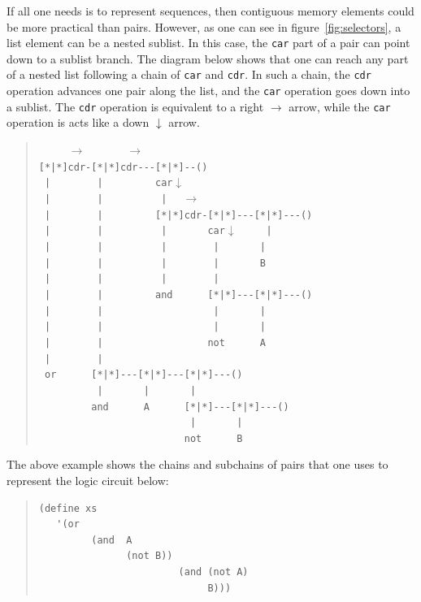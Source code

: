 \documentclass[a4paper,12pt]{book}
\newenvironment{fmpage}[1]
               {\begin{lrbox}{\fmbox}\begin{minipage}{#1}}
               {\end{minipage}\end{lrbox}\fbox{\usebox{\fmbox}}}
\begin{document}
\begin{fmpage}{0.8\linewidth}
\verb||
\end{fmpage}


If all one needs is to represent
sequences, then contiguous memory
elements could be more
practical than pairs. However, as one
can see in figure~\ref{fig:selectors},
a list element can be a nested sublist.
In this case, 
the \verb|car| part of a pair can point down to
a sublist branch. The diagram below shows
that one can reach any part of a nested
list following a chain of \verb|car| and \verb|cdr|.
In such a chain, the \verb|cdr| operation
 advances one pair along the list, and
 the \verb|car| operation goes down into a sublist.
 The \verb|cdr| operation is equivalent to a
 right $\rightarrow$  arrow, while the \verb|car|
 operation is acts like a down $\downarrow$ arrow.
\begin{quote}
\verb"     "$\rightarrow$\verb"       "$\rightarrow$\\
\verb"[*|*]cdr-[*|*]cdr---[*|*]--()"\\
\verb" |        |         car"$\downarrow$\\
\verb" |        |          |  " $\rightarrow$\\
\verb" |        |         [*|*]cdr-[*|*]---[*|*]---()"\\
\verb" |        |          |       car"$\downarrow$\verb"     |"\\
\verb" |        |          |        |       |"\\
\verb" |        |          |        |       B"\\
\verb" |        |          |        |  "\\
\verb" |        |         and      [*|*]---[*|*]---()"\\
\verb" |        |                   |       |"\\
\verb" |        |                   |       |"\\
\verb" |        |                  not      A"\\
\verb" |        |"\\
\verb" or      [*|*]---[*|*]---[*|*]---()"\\          
\verb"          |       |       |"\\                     
\verb"         and      A      [*|*]---[*|*]---()"\\  
\verb"                          |       |"\\                     
\verb"                         not      B"                    
\end{quote}
The above example shows the chains and subchains of
pairs that one uses to represent the logic
circuit below:
\begin{quote}
\begin{verbatim}
(define xs
   '(or 
         (and  A  
               (not B))
                        (and (not A)
                             B)))
\end{verbatim}
\end{quote}
\end{document}
